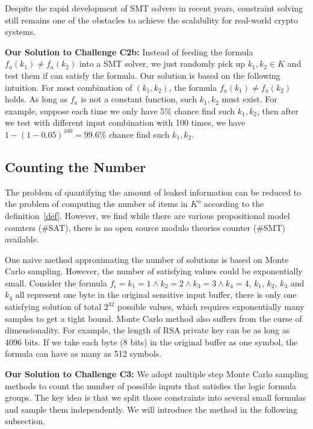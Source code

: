 Despite the rapid development of SMT solvers in recent years, constraint solving still
remains one of the obstacles to achieve the scalability for real-world crypto systems.

\vspace*{2pt}
\textbf{Our Solution to Challenge C2b:}
Instead of feeding the formula $f_a(k_1) \neq f_a(k_2)$ into a SMT solver, we just
randomly pick up $k_1, k_2 \in K$ and test them if can satisfy the formula. Our
solution is based on the following intuition. For most combination of 
$(k_{1}, k_{2} )$, the formula $f_a(k_1) \neq f_a(k_2)$ holds. As long as 
$f_a$ is not a constant function, such $k_1, k_2$ must exist. For example,
suppose each time we only have 5\% chance find such $k_1, k_2$, then
after we test with different input combination with 100 times, we have 
$1 - (1-0.05)^{100} = 99.6\%$ chance find such $k_1, k_2$.

\subsection{Counting the Number}
\label{MCreasons}
The problem of quantifying the amount of leaked information can be reduced to 
the problem of computing the number of items in $K^o$ according to the definition~\ref{def}.
However, we find while there are various propositional model counters (\#SAT), there is no
open source modulo theories counter (\#SMT) available.

One naive method approximating the number of solutions is based on Monte Carlo sampling.
However, the number of satisfying values could be exponentially small. Consider the formula
$f_i={k_1} = 1\land{k_2} = 2\land{k_3} = 3\land{k_4} = 4$, $k_1$, $k_2$, $k_3$ and $k_4$ 
all represent one byte in the original sensitive input buffer, 
there is only one satisfying solution of total $2^{32}$ possible
values, which requires exponentially many samples to get a tight bound. 
Monte Carlo method also suffers from the curse of dimensionality. For example, 
the length of RSA private key can be as long as 4096 bits.
If we take each byte (8 bits) in the original buffer as one symbol, the formula can have 
as many as 512 symbols. 

\vspace*{6pt}
\textbf{Our Solution to Challenge C3:}
We adopt multiple step Monte Carlo sampling methods to count the number of possible inputs
that satisfies the logic formula groups. The key idea is that 
we split those constraints into several small formulas and sample them independently.  
We will introduce the method in the following subsection.

